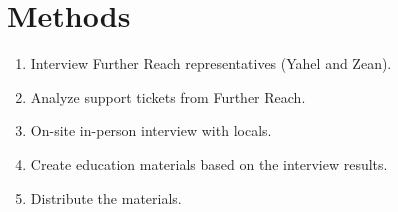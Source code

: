 \section{Methods}
\label{sec:methods}

\begin{enumerate}
\item Interview Further Reach representatives (Yahel and Zean).
\item Analyze support tickets from Further Reach.
\item On-site in-person interview with locals.
\item Create education materials based on the interview results.
\item Distribute the materials.
\end{enumerate}

